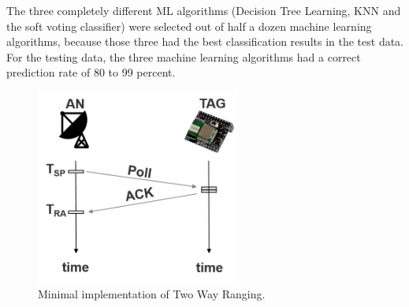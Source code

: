The three completely different ML algorithms (Decision Tree Learning, KNN and the soft voting classifier) were selected out of half a dozen machine learning algorithms, because those three had the best classification results in the test data. For the testing data, the three machine learning algorithms had a correct prediction rate of 80 to 99 percent. 

\begin{figure}[th]
\centering
\includegraphics[width=0.6\textwidth]{Figures/simple_TWR}
\decoRule
\caption[Minimal Two Way Ranging]{Minimal implementation of Two Way Ranging.}
\label{fig:simple_TWR}
\end{figure}


